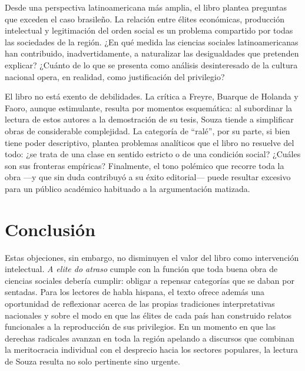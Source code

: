 \documentclass{article}
\begin{document}
Desde una perspectiva latinoamericana más amplia, el libro plantea preguntas que exceden el caso brasileño. La relación entre élites económicas, producción intelectual y legitimación del orden social es un problema compartido por todas las sociedades de la región. ¿En qué medida las ciencias sociales latinoamericanas han contribuido, inadvertidamente, a naturalizar las desigualdades que pretenden explicar? ¿Cuánto de lo que se presenta como análisis desinteresado de la cultura nacional opera, en realidad, como justificación del privilegio?

El libro no está exento de debilidades. La crítica a Freyre, Buarque de Holanda y Faoro, aunque estimulante, resulta por momentos esquemática: al subordinar la lectura de estos autores a la demostración de su tesis, Souza tiende a simplificar obras de considerable complejidad. La categoría de “ralé”, por su parte, si bien tiene poder descriptivo, plantea problemas analíticos que el libro no resuelve del todo: ¿se trata de una clase en sentido estricto o de una condición social? ¿Cuáles son sus fronteras empíricas? Finalmente, el tono polémico que recorre toda la obra —y que sin duda contribuyó a su éxito editorial— puede resultar excesivo para un público académico habituado a la argumentación matizada.


\section{Conclusión}
Estas objeciones, sin embargo, no disminuyen el valor del libro como intervención intelectual. \textit{A elite do atraso} cumple con la función que toda buena obra de ciencias sociales debería cumplir: obligar a repensar categorías que se daban por sentadas. Para los lectores de habla hispana, el texto ofrece además una oportunidad de reflexionar acerca de las propias tradiciones interpretativas nacionales y sobre el modo en que las élites de cada país han construido relatos funcionales a la reproducción de sus privilegios. En un momento en que las derechas radicales avanzan en toda la región apelando a discursos que combinan la meritocracia individual con el desprecio hacia los sectores populares, la lectura de Souza resulta no solo pertinente sino urgente.
\end{document}
